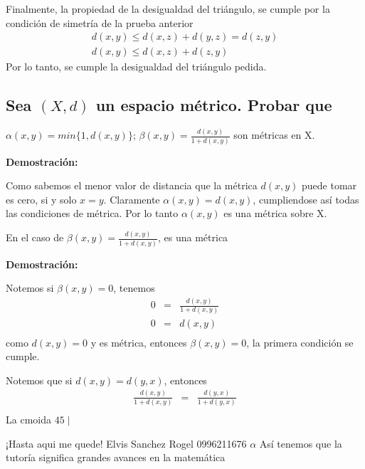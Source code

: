\documentclass[
]{article}
\begin{document}
Finalmente, la propiedad de la desigualdad del triángulo, se cumple por
la condición de simetría de la prueba anterior \begin{eqnarray*}
d(x,y) \leq  d(x,z) + d(y,z)=d(z,y)\\
d(x,y) \leq  d(x,z) + d(z,y)
\end{eqnarray*} Por lo tanto, se cumple la desigualdad del triángulo
pedida.

\hypertarget{sea-xd-un-espacio-muxe9trico.-probar-que}{%
\subsection{\texorpdfstring{Sea \((X,d)\) un espacio métrico. Probar
que}{Sea (X,d) un espacio métrico. Probar que}}\label{sea-xd-un-espacio-muxe9trico.-probar-que}}

\(\alpha (x,y)=min \{1,d(x,y)\}\);
\(\beta (x,y)= \frac{d(x,y)}{1+d(x,y)}\) son métricas en X.

\textbf{Demostración:}

Como sabemos el menor valor de distancia que la métrica \(d(x,y)\) puede
tomar es cero, si y solo \(x=y\). Claramente \(\alpha (x,y)=d(x,y)\),
cumpliendose así todas las condiciones de métrica. Por lo tanto
\(\alpha (x,y)\) es una métrica sobre X.

En el caso de \(\beta (x,y)= \frac{d(x,y)}{1+d(x,y)}\), es una métrica

\textbf{Demostración:}

Notemos si \(\beta (x,y)=0\), tenemos \begin{eqnarray*}
0 & = & \frac{d(x,y)}{1+d(x,y)}\\
0 & = & d(x,y)\\
\end{eqnarray*} como \(d(x,y)=0\) y es métrica, entonces
\(\beta (x,y)=0\), la primera condición se cumple.

Notemos que si \(d(x,y)=d(y,x)\), entonces \begin{eqnarray*}
\frac{d(x,y)}{1+d(x,y)} & = & \frac{d(y,x)}{1+d(y,x)}\\
\end{eqnarray*} La cmoida \(45 \mid\)

¡Hasta aqui me quede! Elvis Sanchez Rogel 0996211676 \(\alpha\) Así
tenemos que la tutoría significa grandes avances en la matemática
\end{document}
